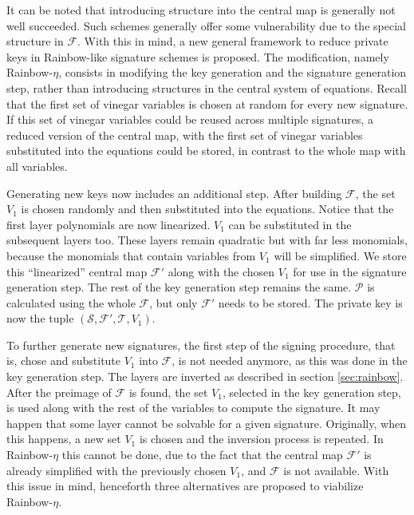 \documentclass{ufsctex/ufsctex}
\begin{document}
It can be noted that introducing structure into the central map is generally
not well succeeded. Such schemes generally offer some vulnerability due to the
special structure in $\mathcal{F}$. With this in mind, a new general framework
to reduce private keys in Rainbow-like signature schemes is proposed. The
modification, namely Rainbow-$\eta$, consists in modifying the key generation
and the signature generation step, rather than introducing structures in the
central system of equations. Recall that the first set of vinegar variables is
chosen at random for every new signature. If this set of vinegar variables
could be reused across multiple signatures, a reduced version of the central
map, with the first set of vinegar variables substituted into the equations
could be stored, in contrast to the whole map with all variables.

Generating new keys now includes an additional step. After building
$\mathcal{F}$, the set $V_1$ is chosen randomly and then substituted into the
equations. Notice that the first layer polynomials are now linearized. $V_1$
can be substituted in the subsequent layers too. These layers remain quadratic
but with far less monomials, because the monomials that contain variables from
$V_1$ will be simplified. We store this ``linearized'' central map
$\mathcal{F'}$ along with the chosen $V_1$ for use in the signature generation
step. The rest of the key generation step remains the same. $\mathcal{P}$ is
calculated using the whole $\mathcal{F}$, but only $\mathcal{F'}$ needs to be
stored. The private key is now the tuple $(\mathcal{S}, \mathcal{F'},
\mathcal{T}, V_1)$.

To further generate new signatures, the first step of the signing procedure,
that is, chose and substitute $V_1$ into $\mathcal{F}$, is not needed anymore,
as this was done in the key generation step. The layers are inverted as
described in section \ref{sec:rainbow}. After the preimage of $\mathcal{F}$ is
found, the set $V_1$, selected in the key generation step, is used along with
the rest of the variables to compute the signature. It may happen that some
layer cannot be solvable for a given signature. Originally, when this happens,
a new set $V_1$ is chosen and the inversion process is repeated. In
Rainbow-$\eta$ this cannot be done, due to the fact that the central map
$\mathcal{F'}$ is already simplified with the previously chosen $V_1$, and
$\mathcal{F}$ is not available. With this issue in mind, henceforth three
alternatives are proposed to viabilize Rainbow-$\eta$.
\end{document}
